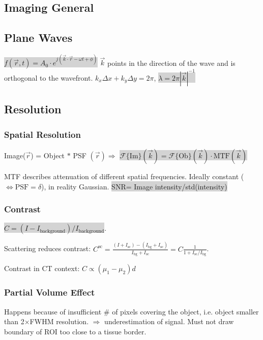 \documentclass[9pt]{article}
\newcommand{\grey}[1]{\setlength{\fboxsep}{0pt}\colorbox{lightgrey}{#1}}
\newcommand{\fcal}{\mathcal{F}}
\begin{document}
\fontsize{9.2pt}{10pt}\selectfont


\begin{multicols}{2}
\section{Imaging General}
\subsection{Plane Waves}
\vspace{-1mm}
\grey{$f(\vec{r},t)=A_0\cdot e^{j(\vec{k}\cdot \vec{r}-\omega t + \phi)}$}
$\vec{k}$ points in the direction of the wave and is orthogonal to the wavefront. $k_x \Delta x+k_y \Delta y = 2\pi$, \grey{$\lambda = 2\pi |\vec{k}|^{-1}$}
\subsection{Resolution}
\subsubsection{Spatial Resolution}

Image($\vec r$) = Object $\ast$ PSF $(\vec r) 
\Rightarrow$  \grey{$\fcal \{\mathrm{Im}\}(\vec k) = \fcal \{\mathrm{Ob}\}(\vec k) \cdot \mathrm{MTF}(\vec k)$}

MTF describes attenuation of different spatial frequencies. Ideally constant ($\Leftrightarrow \mathrm{PSF} = \delta$), in reality Gaussian. \grey{SNR= Image intensity/std(intensity)} 

\subsubsection{Contrast}
\grey{$C =( I - I_\mathrm{background}) / I_\mathrm{background}$}. 

Scattering reduces contrast:
$C^\mathrm{sc} = \frac{(I + I_\mathrm{sc}) - (I_\mathrm{bg} + I_\mathrm{sc})}{I_\mathrm{bg} + I_\mathrm{sc}} = C \frac{1}{1 + I_\mathrm{sc}/I_\mathrm{bg}}$. 

Contrast in CT context: $C \propto (\mu_1 - \mu_2) d$

\subsubsection{Partial Volume Effect}
Happens because of insufficient \# of pixels covering the object, i.e. object smaller than 2$\times$FWHM resolution. $\Rightarrow$ underestimation of signal. Must not draw boundary of ROI too close to a tissue border.


\end{multicols}
\end{document}
